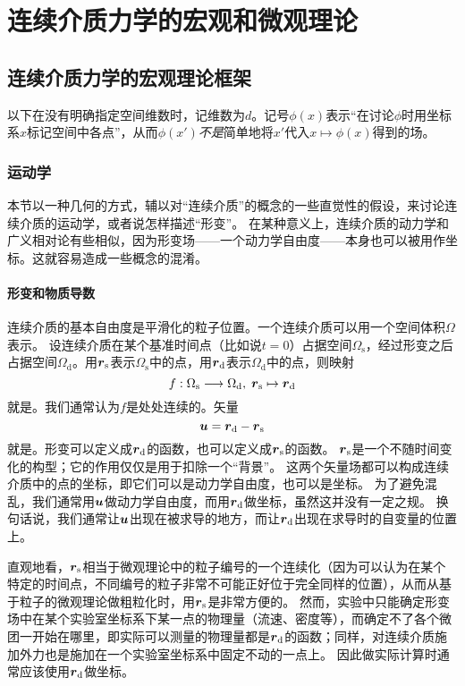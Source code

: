 \part{连续介质力学的宏观和微观理论}\label{part:simple-continuum}

\chapter{连续介质力学的宏观理论框架}

以下在没有明确指定空间维数时，记维数为$d$。记号$\phi(x)$表示“在讨论$\phi$时用坐标系$x$标记空间中各点”，从而$\phi(x')$\emph{不是}简单地将$x'$代入$x \mapsto \phi(x)$得到的场。

\section{运动学}

本节以一种几何的方式，辅以对“连续介质”的概念的一些直觉性的假设，来讨论连续介质的运动学，或者说怎样描述“形变”。
在某种意义上，连续介质的动力学和广义相对论有些相似，因为形变场——一个动力学自由度——本身也可以被用作坐标。这就容易造成一些概念的混淆。

\subsection{形变和物质导数}

连续介质的基本自由度是平滑化的粒子位置。一个连续介质可以用一个空间体积$\Omega$表示。
设连续介质在某个基准时间点（比如说$t=0$）占据空间$\Omega_\text{s}$，经过形变之后占据空间$\Omega_\text{d}$。用$\vb*{r}_\text{s}$表示$\Omega_\text{s}$中的点，用$\vb*{r}_\text{d}$表示$\Omega_\text{d}$中的点，则映射
\[
    f: \Omega_\text{s} \longrightarrow \Omega_\text{d}, \; \vb*{r}_\text{s} \mapsto \vb*{r}_\text{d}
\]
就是。我们通常认为$f$是处处连续的。矢量
\begin{equation}
    \vb*{u} = \vb*{r}_\text{d} - \vb*{r}_\text{s}
\end{equation}
就是。形变可以定义成$\vb*{r}_\text{d}$的函数，也可以定义成$\vb*{r}_\text{s}$的函数。
$\vb*{r}_\text{s}$是一个不随时间变化的构型；它的作用仅仅是用于扣除一个“背景”。
这两个矢量场都可以构成连续介质中的点的坐标，即它们可以是动力学自由度，也可以是坐标。
为了避免混乱，我们通常用$\vb*{u}$做动力学自由度，而用$\vb*{r}_\text{d}$做坐标，虽然这并没有一定之规。
换句话说，我们通常让$\vb*{u}$出现在被求导的地方，而让$\vb*{r}_\text{d}$出现在求导时的自变量的位置上。

直观地看，$\vb*{r}_\text{s}$相当于微观理论中的粒子编号的一个连续化（因为可以认为在某个特定的时间点，不同编号的粒子非常不可能正好位于完全同样的位置），从而从基于粒子的微观理论做粗粒化时，用$\vb*{r}_\text{s}$是非常方便的。
然而，实验中只能确定形变场中在某个实验室坐标系下某一点的物理量（流速、密度等），而确定不了各个微团一开始在哪里，即实际可以测量的物理量都是$\vb*{r}_\text{d}$的函数；同样，对连续介质施加外力也是施加在一个实验室坐标系中固定不动的一点上。
因此做实际计算时通常应该使用$\vb*{r}_\text{d}$做坐标。

